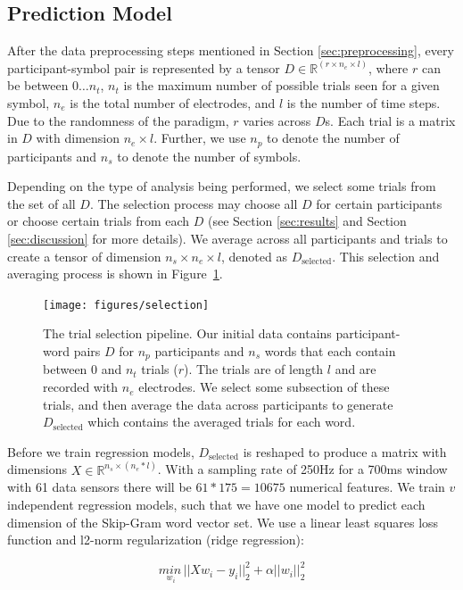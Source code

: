 \subsection{Prediction Model}
After the data preprocessing steps mentioned in Section \ref{sec:preprocessing}, every participant-symbol pair is represented by a tensor $D \in \mathbb{R}^{(r \times n_e \times l)}$, where $r$ can be between $0 \ldots n_t$, $n_t$ is the maximum number of possible trials seen for a given symbol, $n_e$ is the total number of electrodes, and $l$ is the number of time steps. Due to the randomness of the paradigm, $r$ varies across $D$s. Each trial is a matrix in $D$ with dimension $n_e \times l$. Further, we use $n_p$ to denote the number of participants and $n_s$ to denote the number of symbols. 

Depending on the type of analysis being performed, we select some trials from the set of all $D$. The selection process may choose all $D$ for certain participants or choose certain trials from each $D$ (see Section \ref{sec:results} and Section \ref{sec:discussion} for more details). We average across all participants and trials to create a tensor of dimension $n_s \times n_e \times l$, denoted as $D_\text{selected}$. This selection and averaging process is shown in Figure~\ref{fig:selection}.

\begin{figure}[t]
 \centerline{
   \texttt{[image: figures/selection]}
 }
 \caption{The trial selection pipeline. Our initial data contains participant-word pairs $D$ for $n_p$ participants and $n_s$ words that each contain between 0 and $n_t$ trials ($r$). The trials are of length $l$ and are recorded with $n_e$ electrodes. We select some subsection of these trials, and then average the data across participants to generate $D_{\text{selected}}$ which contains the averaged trials for each word.}
 \label{fig:selection}
\end{figure}

Before we train regression models, $D_{\text{selected}}$ is reshaped to produce a matrix with dimensions $X \in \mathbb{R}^{n_s \times (n_e * l)}$.  With a sampling rate of 250Hz for a 700ms window with 61 data sensors there will be $61*175 = 10675$ numerical features. We train $v$ independent regression models, such that we have one model to predict each dimension of the Skip-Gram word vector set. We use a linear least squares loss function and l2-norm regularization (ridge regression):

\begin{equation}
  \underset{w_i}{min\,} {|| X w_i - y_i||_2^2 + \alpha ||w_i||_2^2}
  \label{eq:ridge}
\end{equation}

